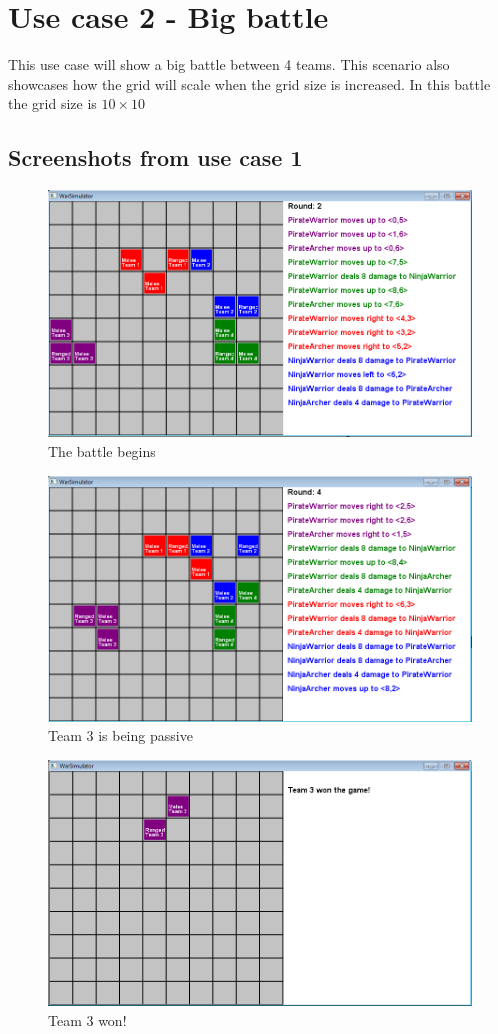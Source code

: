 \section{Use case 2 - Big battle}
	This use case will show a big battle between 4 teams. This scenario also showcases how the grid will scale when the 
	grid size is increased. In this battle the grid size is $10 \times 10$
	
	\subsection{Screenshots from use case 1}
		\begin{figure}
			\center
			\includegraphics[scale=0.6]{rapport/7/figures/case2-1.png}
			\caption{The battle begins}
		\end{figure}
		\begin{figure}
		\center
			\includegraphics[scale=0.6]{rapport/7/figures/case2-2.png}
			\caption{Team 3 is being passive}
		\end{figure}
		\begin{figure}
		\center
			\includegraphics[scale=0.6]{rapport/7/figures/case2-3.png}
			\caption{Team 3 won!}
		\end{figure}